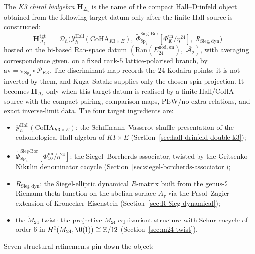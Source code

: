 \begin{definition}
\label{def:k3-chiral-bialgebra}
The \emph{K3 chiral bialgebra} $\mathbf{H}_{\Delta_5}$ is the name of the
compact Hall--Drinfeld object obtained from the following target datum only
after the finite Hall source is constructed:
\[
 \mathbf{H}_{\Delta_5}^{\mathrm{tgt}}
 \;=\;
 \mathcal{D}_\hbar\!\bigl(\mathcal{Y}^{\mathrm{Hall}}_\hbar(\mathrm{CoHA}_{K3\times E}),\;
 \widetilde{\Phi}^{\mathrm{Sieg\text{-}Bor}}_{\mathrm{Sp}_4}[\Phi_{10}^{\mathrm{un}}/\eta^{24}],\;
 R_{\mathrm{Sieg,dyn}}\bigr)
\]
hosted on the bi-based Ran-space datum
$(\mathrm{Ran}(E^{\mathrm{nod,sm}}_{24}),\; \overline{\mathcal{A}_2})$, with
averaging correspondence given, on a fixed rank-\(5\) lattice-polarised branch, by
\(\mathrm{av}=\pi_{\mathrm{Sp}_4}\circ\mathscr P_{K3}\).
The discriminant map records the \(24\) Kodaira points; it is not inverted by them, and Kuga--Satake supplies only the chosen spin projection.
It becomes $\mathbf{H}_{\Delta_5}$ only when this target datum is realised
by a finite Hall/CoHA source with the compact pairing, comparison maps,
PBW/no-extra-relations, and exact inverse-limit data.  The four target
ingredients are:
\begin{itemize}
\item $\mathcal{Y}^{\mathrm{Hall}}_\hbar(\mathrm{CoHA}_{K3\times E})$: the
 Schiffmann--Vasserot shuffle presentation of the cohomological Hall algebra of
 $K3\times E$ (Section~\ref{sec:hall-drinfeld-double-k3});
\item $\widetilde{\Phi}^{\mathrm{Sieg\text{-}Bor}}_{\mathrm{Sp}_4}[\Phi_{10}^{\mathrm{un}}/\eta^{24}]$:
 the Siegel--Borcherds associator, twisted by the Gritsenko--Nikulin denominator cocycle
 (Section~\ref{sec:siegel-borcherds-associator});
\item $R_{\mathrm{Sieg,dyn}}$: the Siegel-elliptic dynamical $R$-matrix built from the
 genus-2 Riemann theta function on the abelian surface $A_\tau$ via the Pasol--Zagier
 extension of Kronecker--Eisenstein (Section~\ref{sec:R-Sieg-dynamical});
\item the $\widetilde{M}_{24}$-twist: the projective $M_{24}$-equivariant structure
 with Schur cocycle of order $6$ in $H^2(M_{24},\U(1))\cong \mathbb{Z}/12$
 (Section~\ref{sec:m24-twist}).
\end{itemize}
\end{definition}

Seven structural refinements pin down the object:

